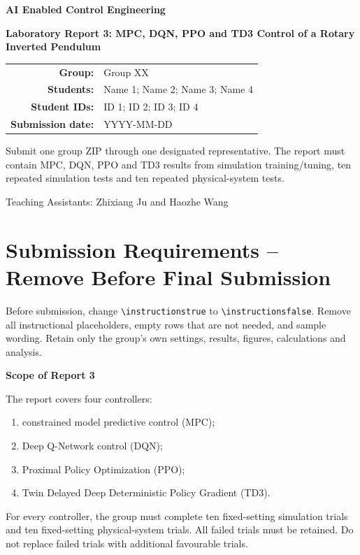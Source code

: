 \documentclass[11pt,a4paper]{article}
\newcommand{\CourseName}{AI Enabled Control Engineering}
\newcommand{\ReportTitle}{Laboratory Report 3: MPC, DQN, PPO and TD3 Control of a Rotary Inverted Pendulum}
\newcommand{\GroupNumber}{Group XX}
\newcommand{\StudentNames}{Name 1; Name 2; Name 3; Name 4}
\newcommand{\StudentIDs}{ID 1; ID 2; ID 3; ID 4}
\newcommand{\SubmissionDate}{YYYY-MM-DD}
\newif\ifinstructions
\begin{document}
\begin{titlepage}
\centering
\vspace*{12mm}
{\Large\bfseries \CourseName\par}
\vspace{11mm}
{\huge\bfseries\color{TAblue} \ReportTitle\par}
\vspace{15mm}
\begin{tabular}{>{\bfseries}rl}
Group: & \GroupNumber\\[2mm]
Students: & \StudentNames\\[2mm]
Student IDs: & \StudentIDs\\[2mm]
Submission date: & \SubmissionDate
\end{tabular}
\vfill
\begin{tcolorbox}[width=0.90\linewidth,colback=TAgray,colframe=TAblue]
\centering
Submit one group ZIP through one designated representative. The report must
contain MPC, DQN, PPO and TD3 results from simulation training/tuning,
ten repeated simulation tests and ten repeated physical-system tests.
\end{tcolorbox}
\vspace{7mm}
{\small Teaching Assistants: Zhixiang Ju and Haozhe Wang}
\end{titlepage}

\ifinstructions
\section*{Submission Requirements -- Remove Before Final Submission}

\begin{warningbox}
Before submission, change \verb|\instructionstrue| to
\verb|\instructionsfalse|. Remove all instructional placeholders, empty rows
that are not needed, and sample wording. Retain only the group's own settings,
results, figures, calculations and analysis.
\end{warningbox}

\begin{requirementbox}
\textbf{Scope of Report 3}

The report covers four controllers:
\begin{enumerate}
  \item constrained model predictive control (MPC);
  \item Deep Q-Network control (DQN);
  \item Proximal Policy Optimization (PPO);
  \item Twin Delayed Deep Deterministic Policy Gradient (TD3).
\end{enumerate}
For every controller, the group must complete ten fixed-setting simulation
trials and ten fixed-setting physical-system trials. All failed trials must be
retained. Do not replace failed trials with additional favourable trials.
\end{requirementbox}
\end{document}
